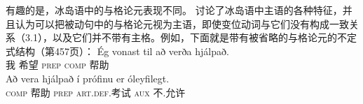 \noindent
有趣的是，冰岛语中的与格论元表现不同。 \citet{ZMT85a}讨论了冰岛语中主语的各种特征，并且认为可以把被动句中的与格论元视为主语，即使变位动词与它们没有构成一致关系（3.1），以及它们并不带有主格。例如，下面就是带有被省略的与格论元的不定式结构（第457页）：
\eal
\ex 
\gll Ég vonast til  að verða hjálpað.\\
     我 希望    \textsc{prep} \textsc{comp} \passive{} 帮助\\
\ex
\gll Að vera hjálpað í prófinu er óleyfilegt.\\
     \textsc{comp} \passive{} 帮助 \textsc{prep} \textsc{art}.\textsc{def}.考试 \textsc{aux} 不.允许\\
\zl

